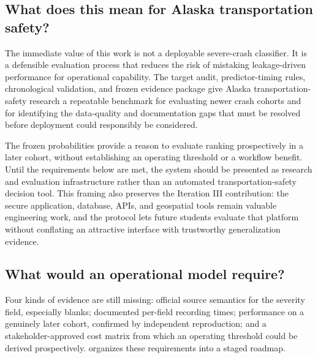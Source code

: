 \documentclass[11pt,letterpaper]{article}
\begin{document}
\subsection{What does this mean for Alaska transportation safety?}
\label{sec:practical}
The immediate value of this work is not a deployable severe-crash classifier. It is a defensible evaluation process that reduces the risk of mistaking leakage-driven performance for operational capability. The target audit, predictor-timing rules, chronological validation, and frozen evidence package give Alaska transportation-safety research a repeatable benchmark for evaluating newer crash cohorts and for identifying the data-quality and documentation gaps that must be resolved before deployment could responsibly be considered.

The frozen probabilities provide a reason to evaluate ranking prospectively in a later cohort, without establishing an operating threshold or a workflow benefit. Until the requirements below are met, the system should be presented as research and evaluation infrastructure rather than an automated transportation-safety decision tool. This framing also preserves the Iteration III contribution: the secure application, database, APIs, and geospatial tools remain valuable engineering work, and the protocol lets future students evaluate that platform without conflating an attractive interface with trustworthy generalization evidence.

\subsection{What would an operational model require?}
Four kinds of evidence are still missing: official source semantics for the severity field, especially blanks; documented per-field recording times; performance on a genuinely later cohort, confirmed by independent reproduction; and a stakeholder-approved cost matrix from which an operating threshold could be derived prospectively.  organizes these requirements into a staged roadmap.

\FloatBarrier
\end{document}
